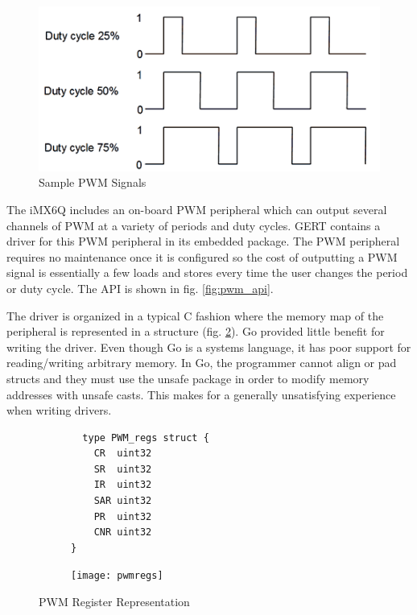 \begin{figure}[h]
\begin{center}
  \includegraphics[scale=0.5]{pwm}
\end{center}
  \caption{Sample PWM Signals} \label{fig:pwm}
\end{figure}


The iMX6Q includes an on-board PWM peripheral which can output several channels of PWM
at a variety of periods and duty cycles. GERT contains a driver for this PWM peripheral in its embedded
package. The PWM peripheral requires no maintenance once it is configured so the cost of outputting
a PWM signal is essentially a few loads and stores every time the user changes the period or duty cycle.
The API is shown in fig. \ref{fig:pwm_api}.

The driver is organized in a typical C fashion where the memory map of the peripheral is represented in a structure (fig. \ref{fig:pwm_struct}).
Go provided little benefit for writing the driver. Even though Go is a systems language, it has poor
support for reading/writing arbitrary memory. In Go, the programmer cannot align or pad structs
and they must use the unsafe package in order to modify memory addresses with unsafe casts. This makes for a generally
unsatisfying experience when writing drivers.


\begin{figure}[h]
  \begin{subfigure}[t!]{0.5\textwidth}
  \begin{lstlisting}
  type PWM_regs struct {
	CR  uint32
	SR  uint32
	IR  uint32
	SAR uint32
	PR  uint32
	CNR uint32
}
  \end{lstlisting}
  \end{subfigure}
  \begin{subfigure}[t!]{0.5\textwidth}
 \texttt{[image: pwmregs]}
  \end{subfigure}
  \caption{PWM Register Representation} \label{fig:pwm_struct}
\end{figure}


